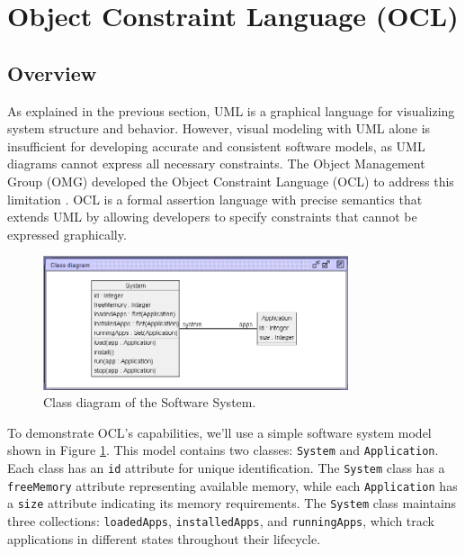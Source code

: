 \section{Object Constraint Language (OCL)}
\label{sec:ocl}

\subsection{Overview}

\hspace{1cm} As explained in the previous section, UML is a graphical language for 
visualizing system structure and behavior. However, visual modeling with UML alone 
is insufficient for developing accurate and consistent software models, as UML 
diagrams cannot express all necessary constraints. The Object Management Group (OMG) 
developed the Object Constraint Language (OCL) to address this limitation \cite{OCL}. 
OCL is a formal assertion language with precise semantics that extends UML by 
allowing developers to specify constraints that cannot be expressed graphically. 

\begin{figure}
    \begin{center}
        \includegraphics[width=0.8\textwidth]{figures/c1/SoftwareSystem/SS_Ver2_Gray.png}
        \caption{Class diagram of the Software System.}
        \label{fig:class_diagram_software_system}
    \end{center}
\end{figure}

To demonstrate OCL's capabilities, we'll use a simple software system model shown 
in Figure \ref{fig:class_diagram_software_system}. This model contains two classes: 
\texttt{System} and \texttt{Application}. Each class has an \texttt{id} attribute 
for unique identification. The \texttt{System} class has a \texttt{freeMemory} attribute 
representing available memory, while each \texttt{Application} has a \texttt{size} 
attribute indicating its memory requirements. The \texttt{System} class maintains three 
collections: \texttt{loadedApps}, \texttt{installedApps}, and \texttt{runningApps}, which 
track applications in different states throughout their lifecycle.

